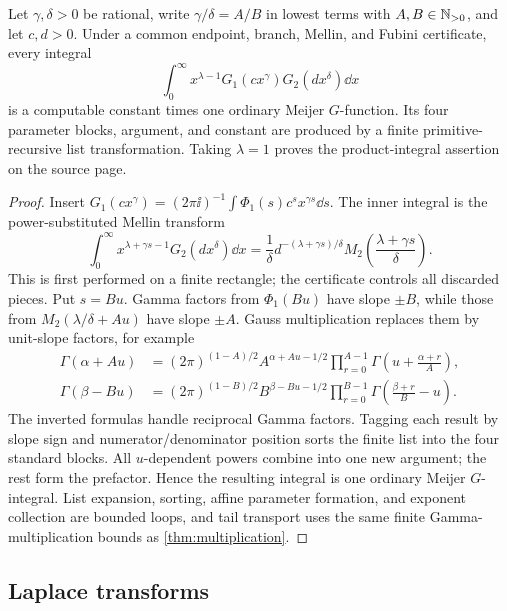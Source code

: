 \begin{theorem}\label{thm:rational-power-product}
Let $\gamma,\delta>0$ be rational, write
$\gamma/\delta=A/B$ in lowest terms with $A,B\in\mathbb N_{>0}$, and let $c,d>0$.
Under a common endpoint, branch, Mellin, and Fubini certificate, every integral
\begin{equation}\label{eq:rational-power-product}
 \int_0^\infty x^{\lambda-1}G_1(cx^\gamma)G_2(dx^\delta)\dd x
\end{equation}
is a computable constant times one ordinary Meijer $G$-function.  Its four
parameter blocks, argument, and constant are produced by a finite
primitive-recursive list transformation.  Taking $\lambda=1$ proves the
product-integral assertion on the source page.
\end{theorem}
\begin{proof}
Insert
$G_1(cx^\gamma)=(2\pi\ii)^{-1}\int\Phi_1(s)c^sx^{\gamma s}\dd s$.
The inner integral is the power-substituted Mellin transform
\[
 \int_0^\infty x^{\lambda+\gamma s-1}G_2(dx^\delta)\dd x
 =\frac1\delta d^{-(\lambda+\gamma s)/\delta}
 M_2\!\left(\frac{\lambda+\gamma s}{\delta}\right).
\]
This is first performed on a finite rectangle; the certificate controls all
discarded pieces.  Put $s=Bu$.  Gamma factors from $\Phi_1(Bu)$ have slope
$\pm B$, while those from $M_2(\lambda/\delta+Au)$ have slope $\pm A$.
Gauss multiplication replaces them by unit-slope factors, for example
\begin{align*}
 \Gamma(\alpha+Au)
 &= (2\pi)^{(1-A)/2}A^{\alpha+Au-1/2}
    \prod_{r=0}^{A-1}\Gamma\!\left(u+\frac{\alpha+r}{A}\right),\\
 \Gamma(\beta-Bu)
 &= (2\pi)^{(1-B)/2}B^{\beta-Bu-1/2}
    \prod_{r=0}^{B-1}\Gamma\!\left(\frac{\beta+r}{B}-u\right).
\end{align*}
The inverted formulas handle reciprocal Gamma factors.  Tagging each result by
slope sign and numerator/denominator position sorts the finite list into the
four standard blocks.  All $u$-dependent powers combine into one new argument;
the rest form the prefactor.  Hence the resulting integral is one ordinary
Meijer $G$-integral.  List expansion, sorting, affine parameter formation, and
exponent collection are bounded loops, and tail transport uses the same
finite Gamma-multiplication bounds as \cref{thm:multiplication}.
\end{proof}

\subsection{Laplace transforms}

